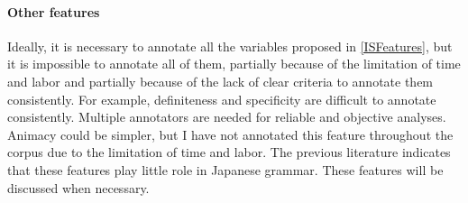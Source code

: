 

\paragraph{Other features}

Ideally, it is necessary to annotate all the variables proposed in \ref{ISFeatures},
but it is impossible to annotate all of them,
partially because of the limitation of time and labor and 
partially because of the lack of clear criteria to annotate them consistently.
For example, definiteness and specificity are difficult to annotate consistently.
Multiple annotators are needed for reliable and objective analyses.
Animacy could be simpler, but I have not annotated this feature throughout the corpus due to the limitation of time and labor.
The previous literature indicates that
these features play little role in Japanese grammar.
These features will be discussed when necessary.

